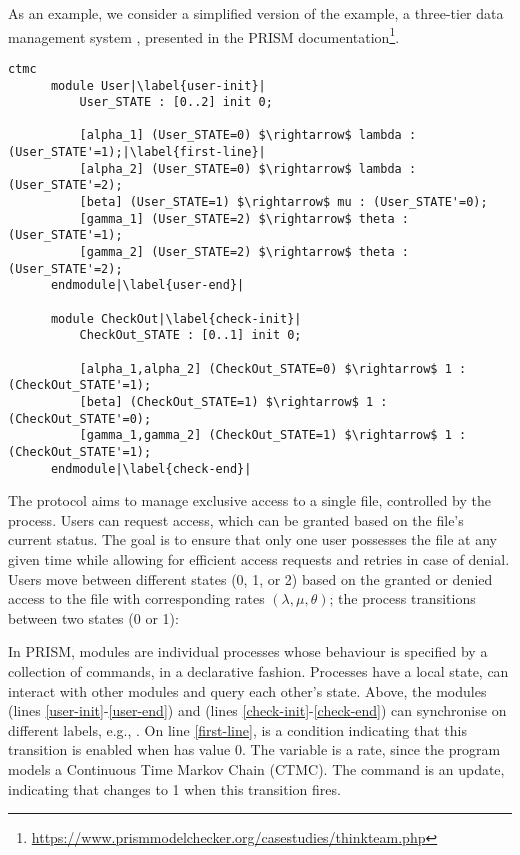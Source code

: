As an example, we consider a simplified version of the
 example, a three-tier data management system
\cite{DBLP:journals/entcs/BeekMLGFS05}, presented in the PRISM
documentation\footnote{\url{https://www.prismmodelchecker.org/casestudies/thinkteam.php}}.
%
\begin{lstlisting}[style=prism-color,% caption={A PRISM example},captionpos=b,
	frame=none,label={example1},escapechar=|]
	  ctmc 
	  module User|\label{user-init}|
		  User_STATE : [0..2] init 0;
	  
		  [alpha_1] (User_STATE=0) $\rightarrow$ lambda : (User_STATE'=1);|\label{first-line}|
		  [alpha_2] (User_STATE=0) $\rightarrow$ lambda : (User_STATE'=2);
		  [beta] (User_STATE=1) $\rightarrow$ mu : (User_STATE'=0);
		  [gamma_1] (User_STATE=2) $\rightarrow$ theta : (User_STATE'=1);
		  [gamma_2] (User_STATE=2) $\rightarrow$ theta : (User_STATE'=2);
	  endmodule|\label{user-end}|
	  
	  module CheckOut|\label{check-init}|
		  CheckOut_STATE : [0..1] init 0;
	  
		  [alpha_1,alpha_2] (CheckOut_STATE=0) $\rightarrow$ 1 : (CheckOut_STATE'=1);
		  [beta] (CheckOut_STATE=1) $\rightarrow$ 1 : (CheckOut_STATE'=0);
		  [gamma_1,gamma_2] (CheckOut_STATE=1) $\rightarrow$ 1 : (CheckOut_STATE'=1);
	  endmodule|\label{check-end}|
  \end{lstlisting}
The protocol aims to manage exclusive access to a single file,
  controlled by the  process. Users can request
  access, which can be granted based on the file's current status. The
  goal is to ensure that only one user possesses the file at any given
  time while allowing for efficient access requests and retries in
  case of denial. Users move between different states (0, 1, or 2)
based on the granted or denied access to the file with corresponding
rates $(\lambda, \mu, \theta)$; the  process
transitions between two states (0 or 1):

In PRISM, modules are individual processes whose behaviour is
specified by a collection of commands, in a declarative fashion.
Processes have a local state, can interact with other modules and
query each other's state. Above, the modules  (lines
\ref{user-init}-\ref{user-end}) and  (lines
\ref{check-init}-\ref{check-end}) can synchronise on different labels, e.g., 
. 
On line \ref{first-line},  is a condition
indicating that this transition is enabled when 
has value 0. The variable  is a rate, since the
program models a Continuous Time Markov Chain (CTMC). The command
 is an update, indicating that
 changes to 1 when this transition fires.

